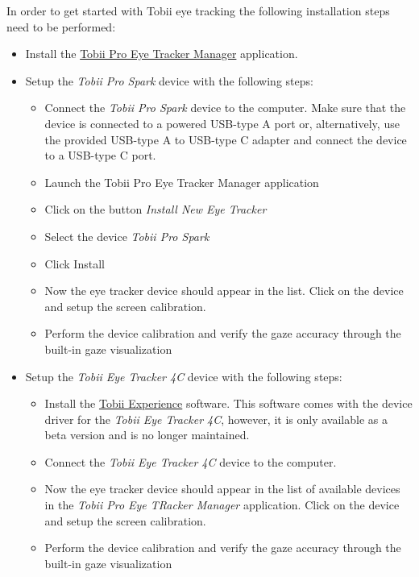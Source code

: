 \documentclass[a4paper,oneside]{book}
\begin{document}
In order to get started with Tobii eye tracking the following installation steps need to be performed:
\begin{itemize}
    \item Install the \href{https://www.tobii.com/products/software/applications-and-developer-kits/tobii-pro-eye-tracker-manager}{Tobii Pro Eye Tracker Manager} application.
    \item Setup the \emph{Tobii Pro Spark} device with the following steps:
        \begin{itemize}
            \item Connect the \emph{Tobii Pro Spark} device to the computer.
                Make sure that the device is connected to a powered USB-type A port or, alternatively, use the provided USB-type A to USB-type C adapter and connect the device to a USB-type C port.
            \item Launch the Tobii Pro Eye Tracker Manager application
            \item Click on the button \emph{Install New Eye Tracker}
            \item Select the device \emph{Tobii Pro Spark}
            \item Click Install
            \item Now the eye tracker device should appear in the list.
                Click on the device and setup the screen calibration.
            \item Perform the device calibration and verify the gaze accuracy through the built-in gaze visualization
        \end{itemize}
    \item Setup the \emph{Tobii Eye Tracker 4C} device with the following steps:
        \begin{itemize}
            \item Install the \href{https://files.update.tech.tobii.com/Tobii.IS4C.Offline.Installer_4.124.0.15937.msi}{Tobii Experience} software.
                This software comes with the device driver for the \emph{Tobii Eye Tracker 4C}, however, it is only available as a beta version and is no longer maintained.
            \item Connect the \emph{Tobii Eye Tracker 4C} device to the computer.
            \item Now the eye tracker device should appear in the list of available devices in the \emph{Tobii Pro Eye TRacker Manager} application.
                Click on the device and setup the screen calibration.
            \item Perform the device calibration and verify the gaze accuracy through the built-in gaze visualization

\end{itemize}
\end{itemize}
\end{document}
